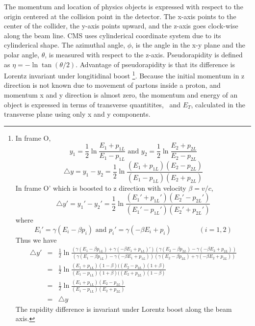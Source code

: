 The momentum and location of physics objects is expressed with respect to the origin 
centered at the collision point in the detector. The x-axis points to the center 
of the collider, the y-axis points upward, and the z-axis goes clock-wise along the 
beam line. CMS uses cylinderical coordinate system due to its cylinderical shape. 
The azimuthal angle, $\phi$, is the angle in the x-y plane 
and the polar angle, $\theta$, is measured with respect to the z-axis. 
Pseudorapidity is defined as $\eta = - \ln \tan(\theta/2)$. 
Advantage of pseudorapidity is that its difference is Lorentz invariant 
under longitidinal boost \footnote[1]{  
In frame O, 
\begin{equation} 
y_1 = \frac{1}{2} \ln \frac{E_1+p_{1L}}{E_1-p_{1L}} \textrm{ and } 
y_2 = \frac{1}{2} \ln \frac{E_2+p_{2L}}{E_2-p_{2L}}  
\end{equation} 
\begin{equation} 
\triangle y = y_1 - y_2 = \frac{1}{2} 
  \ln \frac{(E_1+p_{1L})(E_2-p_{2L})}{(E_1-p_{1L})(E_2+p_{2L})} 
\end{equation} 
In frame O' which is boosted to z direction with velocity $\beta = v / c$, 
\begin{equation} 
\triangle y' = y_1' - y_2' =  \frac{1}{2} 
  \ln \frac{(E_1'+p_{1L}')(E_2'-p_{2L}')}{(E_1'-p_{1L}')(E_2'+p_{2L}')} 
\end{equation}
where 
\begin{equation} 
E_i' = \gamma(E_i - \beta p_i) \textrm{ and } p_i' = \gamma(-\beta E_i + p_i)
\quad \quad \quad \quad (i = 1, 2)
\end{equation} 
Thus we have 
\begin{eqnarray} 
\triangle y' 
 &=& 
 \frac{1}{2} 
  \ln \frac{( \gamma(E_1 - \beta p_{1L})+\gamma(-\beta E_1 + p_{1L})')
            ( \gamma(E_2 - \beta p_{2L})-\gamma(-\beta E_2 + p_{2L}))}
           {( \gamma(E_1 - \beta p_{1L})-\gamma(-\beta E_1 + p_{1L}))
            ( \gamma(E_2 - \beta p_{2L})+\gamma(-\beta E_2 + p_{2L}))}  \\
 &=& 
 \frac{1}{2} 
  \ln \frac{ (E_1+p_{1L})(1-\beta)((E_2-p_{2L})(1+\beta) }
           { (E_1-p_{1L})(1+\beta)((E_2+p_{2L})(1-\beta) } \\ 
 &=& 
 \frac{1}{2} 
  \ln \frac{ (E_1+p_{1L})(E_2-p_{2L}) }
           { (E_1-p_{1L})(E_2+p_{2L}) } \\ 
 &=& \triangle y
\end{eqnarray} 
The rapidity difference is invariant under Lorentz boost along the beam axis. 
}.
Because the initial momentum in z direction is not known due to movement of 
partons inside a proton, and momentum x and y direction is almost zero, 
the momentum and energy of an object is expressed in terms of 
transverse quantitites, \pt\ and $E_T$, calculated in the transverse plane using 
only x and y components.

